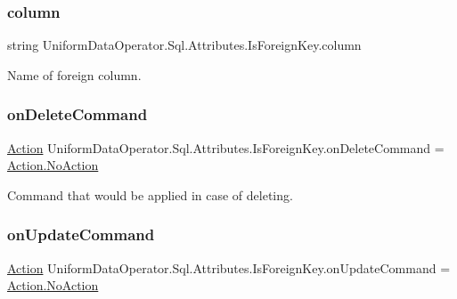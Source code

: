 \subsubsection{\texorpdfstring{column}{column}}
{\footnotesize\ttfamily string Uniform\+Data\+Operator.\+Sql.\+Attributes.\+Is\+Foreign\+Key.\+column}



Name of foreign column. 

\mbox{\label{class_uniform_data_operator_1_1_sql_1_1_attributes_1_1_is_foreign_key_af70b31f4805f136d6a32b1fa33d9bbf6}} 
\subsubsection{\texorpdfstring{on\+Delete\+Command}{onDeleteCommand}}
{\footnotesize\ttfamily \mbox{\hyperlink{class_uniform_data_operator_1_1_sql_1_1_attributes_1_1_is_foreign_key_a6039622384e2bbd1aa386e326ee0f850}{Action}} Uniform\+Data\+Operator.\+Sql.\+Attributes.\+Is\+Foreign\+Key.\+on\+Delete\+Command = \mbox{\hyperlink{class_uniform_data_operator_1_1_sql_1_1_attributes_1_1_is_foreign_key_a6039622384e2bbd1aa386e326ee0f850a1e601ea653db1c729c9ee5746730fabe}{Action.\+No\+Action}}}



Command that would be applied in case of deleting. 

\mbox{\label{class_uniform_data_operator_1_1_sql_1_1_attributes_1_1_is_foreign_key_a3a45eb5c4419a10aafcc097c227bb794}} 
\subsubsection{\texorpdfstring{on\+Update\+Command}{onUpdateCommand}}
{\footnotesize\ttfamily \mbox{\hyperlink{class_uniform_data_operator_1_1_sql_1_1_attributes_1_1_is_foreign_key_a6039622384e2bbd1aa386e326ee0f850}{Action}} Uniform\+Data\+Operator.\+Sql.\+Attributes.\+Is\+Foreign\+Key.\+on\+Update\+Command = \mbox{\hyperlink{class_uniform_data_operator_1_1_sql_1_1_attributes_1_1_is_foreign_key_a6039622384e2bbd1aa386e326ee0f850a1e601ea653db1c729c9ee5746730fabe}{Action.\+No\+Action}}}



